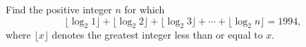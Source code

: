 Find the positive integer $n$ for which
\[
\lfloor\log_2 1\rfloor+\lfloor\log_2 2\rfloor+\lfloor\log_2 3\rfloor+\cdots+\lfloor\log_2 n\rfloor=1994 ,
\]
where $\lfloor x\rfloor$ denotes the greatest integer less than or equal to $x$.
